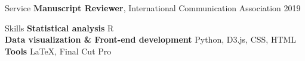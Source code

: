 \documentclass{resume}
\begin{document}
\begin{rSection}{Service}
{\textbf {Manuscript Reviewer}, International Communication Association} \hfill {2019} 
\end{rSection}

\begin{rSection}{Skills}
{\bf Statistical analysis} \hspace{1em} R\\ 
{\bf Data visualization \& Front-end development} \hspace{1em} Python, D3.js, CSS, HTML \\
{\bf Tools } \hspace{1em} \LaTeX, 
Final Cut Pro

\end{rSection}

\newpage
\thispagestyle{reference}

\end{document}
